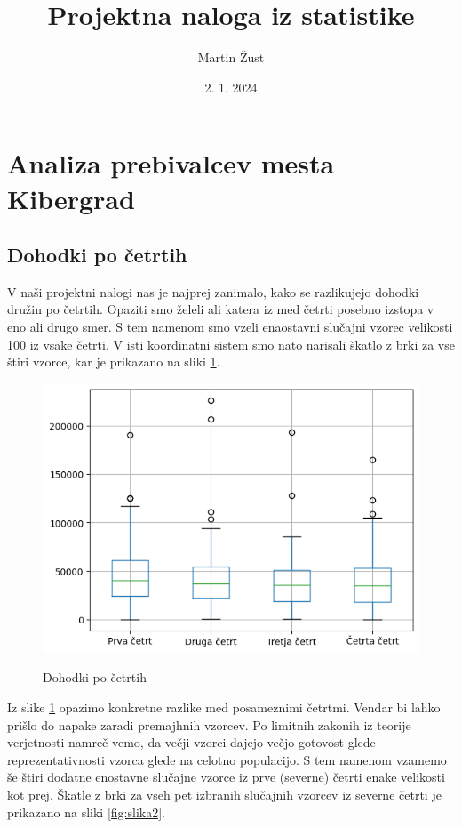 \documentclass{article}
\title{Projektna naloga iz statistike}
\author{Martin Žust}
\date{2. 1. 2024}
\begin{document}
\section{Analiza prebivalcev mesta Kibergrad}

\subsection{Dohodki po četrtih}
V naši projektni nalogi nas je najprej zanimalo, kako se razlikujejo dohodki družin po četrtih. Opaziti smo želeli ali katera iz med četrti 
posebno izstopa v eno ali drugo smer. S tem namenom smo vzeli enaostavni slučajni vzorec velikosti 100 iz vsake četrti. V isti koordinatni sistem smo nato 
narisali škatlo z brki za vse štiri vzorce, kar je prikazano na sliki \ref{fig:slika1}.

\begin{figure}[H]
    \caption{Dohodki po četrtih}
    \centering
    \includegraphics[scale=0.8]{dohodki_po_cetrtih.png}
    \label{fig:slika1}
\end{figure}

Iz slike \ref{fig:slika1} opazimo konkretne razlike med posameznimi četrtmi. Vendar bi lahko prišlo do napake zaradi premajhnih vzorcev. Po limitnih 
zakonih iz teorije verjetnosti namreč vemo, da večji vzorci dajejo večjo gotovost glede reprezentativnosti vzorca glede na celotno populacijo. S tem namenom 
vzamemo še štiri dodatne enostavne slučajne vzorce iz prve (severne) četrti enake velikosti kot prej. Škatle z brki za vseh pet izbranih slučajnih vzorcev iz severne 
četrti je prikazano na sliki \ref{fig:slika2}.
\end{document}
